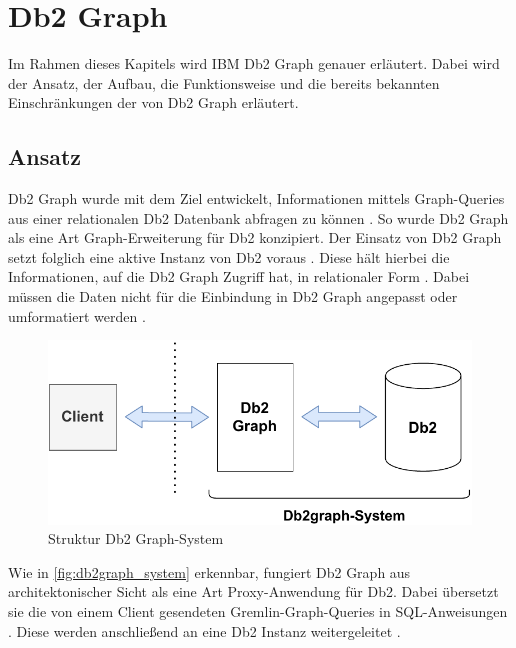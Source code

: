 \section{Db2 Graph}
\label{chap:db2graph}

Im Rahmen dieses Kapitels wird IBM Db2 Graph genauer erläutert. Dabei wird der Ansatz, der Aufbau, die Funktionsweise und die bereits bekannten Einschränkungen der von Db2 Graph erläutert. 

\subsection{Ansatz}
\label{db2graph:ansatz}
Db2 Graph wurde mit dem Ziel entwickelt, Informationen mittels Graph-Queries aus einer relationalen Db2 Datenbank abfragen zu können \cite{vldb_tian, sigmod_tian}. So wurde Db2 Graph als eine Art Graph-Erweiterung für Db2 konzipiert. Der Einsatz von Db2 Graph setzt folglich eine aktive Instanz von Db2 voraus \cite{vldb_tian, sigmod_tian}. Diese hält hierbei die Informationen, auf die Db2 Graph Zugriff hat, in relationaler Form \cite{vldb_tian, sigmod_tian}. Dabei müssen die Daten nicht für die Einbindung in Db2 Graph angepasst oder umformatiert werden \cite{vldb_tian, sigmod_tian}.

\begin{figure}[ht]
    \centering
    \includegraphics[width=\textwidth]{images/db2graph_system.pdf}
    \vspace{0.1em}
    \caption{Struktur Db2 Graph-System}
    \label{fig:db2graph_system}
\end{figure}

Wie in \autoref{fig:db2graph_system} erkennbar, fungiert Db2 Graph aus architektonischer Sicht als eine Art Proxy-Anwendung für Db2. Dabei übersetzt sie die von einem Client gesendeten Gremlin-Graph-Queries in SQL-An\-wei\-sung\-en \cite{vldb_tian, sigmod_tian}. Diese werden anschließend an eine Db2 Instanz weitergeleitet \cite{vldb_tian, sigmod_tian}. 

